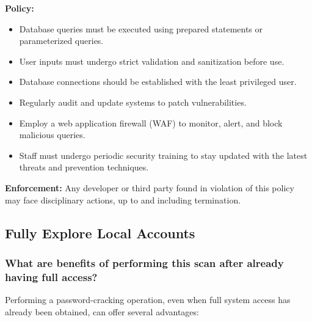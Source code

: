 \textbf{Policy:}
\begin{itemize}
    \item Database queries must be executed using prepared statements or parameterized queries.
    \item User inputs must undergo strict validation and sanitization before use.
    \item Database connections should be established with the least privileged user.
    \item Regularly audit and update systems to patch vulnerabilities.
    \item Employ a web application firewall (WAF) to monitor, alert, and block malicious queries.
    \item Staff must undergo periodic security training to stay updated with the latest threats and prevention techniques.
\end{itemize}

\textbf{Enforcement:}
Any developer or third party found in violation of this policy may face disciplinary actions, up to and including termination.

\subsection{Fully Explore Local Accounts}

\subsubsection{What are benefits of performing this scan after already having full access?}
Performing a password-cracking operation, even when full system access has already been obtained, can offer several advantages:

